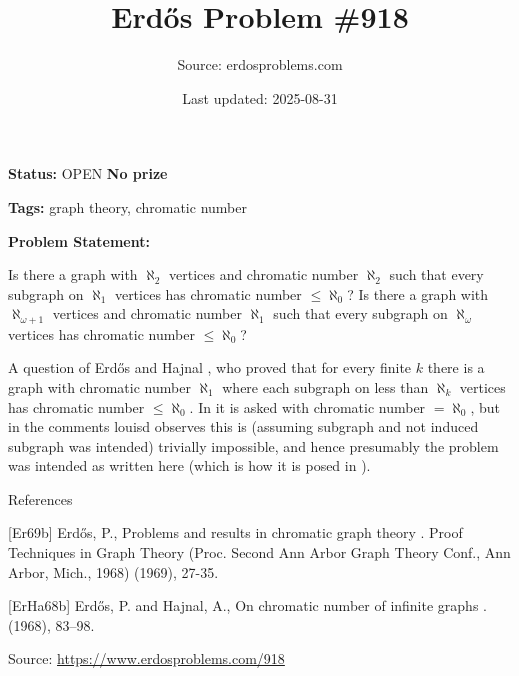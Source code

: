 \documentclass{article}
\title{Erd\H{o}s Problem \#918}
\date{Last updated: 2025-08-31}
\author{Source: erdosproblems.com}
\begin{document}
\maketitle

\noindent\textbf{Status:} OPEN \quad \textbf{No prize}

\noindent\textbf{Tags:} graph theory, chromatic number

\medskip

\noindent\textbf{Problem Statement:}

Is there a graph with $\aleph_2$ vertices and chromatic number $\aleph_2$ such that every subgraph on $\aleph_1$ vertices has chromatic number $\leq\aleph_0$? Is there a graph with $\aleph_{\omega+1}$ vertices and chromatic number $\aleph_1$ such that every subgraph on $\aleph_\omega$ vertices has chromatic number $\leq\aleph_0$?




A question of Erd\H{o}s and Hajnal \cite{ErHa68b}, who proved that for every finite $k$ there is a graph with chromatic number $\aleph_1$ where each subgraph on less than $\aleph_k$ vertices has chromatic number $\leq \aleph_0$. In \cite{Er69b} it is asked with chromatic number $=\aleph_0$, but in the comments louisd observes this is (assuming subgraph and not induced subgraph was intended) trivially impossible, and hence presumably the problem was intended as written here (which is how it is posed in \cite{ErHa68b}).




References

[Er69b] Erd\H{o}s, P., Problems and results in chromatic graph theory . Proof Techniques in Graph Theory (Proc. Second Ann Arbor Graph Theory Conf., Ann Arbor, Mich., 1968) (1969), 27-35.

[ErHa68b] Erd\H{o}s, P. and Hajnal, A., On chromatic number of infinite graphs . (1968), 83--98.


\bigskip
\noindent\small{Source: \url{https://www.erdosproblems.com/918}}
\end{document}
